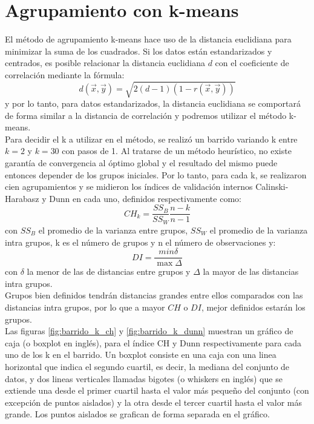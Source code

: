 \section{Agrupamiento con k-means}
El método de agrupamiento k-means hace uso de la distancia euclidiana para minimizar la suma de los cuadrados. Si los datos están estandarizados y centrados, es posible relacionar la distancia euclidiana $d$ con el coeficiente de correlación mediante la fórmula:
\begin{equation}
	d(\vec{x}, \vec{y}) = \sqrt{2(d-1)(1-r(\vec{x}, \vec{y}))}
\end{equation}
y por lo tanto, para datos estandarizados, la distancia euclidiana se comportará de forma similar a la distancia de correlación y podremos utilizar el método k-means.\\
Para decidir el k a utilizar en el método, se realizó un barrido variando k entre $k=2$ y $k=30$ con pasos de 1. Al tratarse de un método heurístico, no existe garantía de convergencia al óptimo global y el resultado del mismo puede entonces depender de los grupos iniciales. Por lo tanto, para cada k, se realizaron cien agrupamientos y se midieron los índices de validación internos Calinski-Harabasz y Dunn en cada uno, definidos respectivamente como:
\begin{equation}
	CH_k = \frac{SS_B}{SS_W}\frac{n-k}{n-1}
\end{equation}
con $SS_B$ el promedio de la varianza entre grupos, $SS_W$ el promedio de la varianza intra grupos, k es el número de grupos y n el número de observaciones y:
\begin{equation}
	DI = \frac{min\delta}{\max\Delta}
\end{equation}
con $\delta$ la menor de las de distancias entre grupos y $\Delta$ la mayor de las distancias intra grupos.\\
Grupos bien definidos tendrán distancias grandes entre ellos comparados con las distancias intra grupos, por lo que a mayor $CH$ o $DI$, mejor definidos estarán los grupos.\\
Las figuras \ref{fig:barrido_k_ch} y \ref{fig:barrido_k_dunn} muestran un gráfico de caja (o boxplot en inglés), para el índice CH y Dunn respectivamente para cada uno de los k en el barrido. Un boxplot consiste en una caja con una linea horizontal que indica el segundo cuartil, es decir, la mediana del conjunto de datos, y dos lineas verticales llamadas bigotes (o whiskers en inglés) que se extiende una desde el primer cuartil hasta el valor más pequeño del conjunto (con excepción de puntos aislados) y la otra desde el tercer cuartil hasta el valor más grande. Los puntos aislados se grafican de forma separada en el gráfico.
